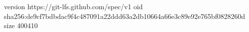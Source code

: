 version https://git-lfs.github.com/spec/v1
oid sha256:de9cf7bdbdac9f4c487091a22ddd63a2db10664a66e3c89e92e765bf0828260d
size 400410
